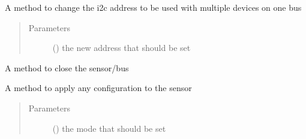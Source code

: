 \documentclass[letterpaper,10pt,english]{sphinxmanual}
\begin{document}
\begin{fulllineitems}
\begin{fulllineitems}
\label{\detokenize{sim_interfaces:lib.sim_interfaces.SimSensor.change_addr}}
A method to change the i2c address to be used with multiple devices on one bus
\begin{quote}\begin{description}
\item[{Parameters}] \leavevmode
{} () \textendash{} the new address that should be set

\end{description}\end{quote}

\end{fulllineitems}


\begin{fulllineitems}
\label{\detokenize{sim_interfaces:lib.sim_interfaces.SimSensor.close}}
A method to close the sensor/bus

\end{fulllineitems}


\begin{fulllineitems}
\label{\detokenize{sim_interfaces:lib.sim_interfaces.SimSensor.configure}}
A method to apply any configuration to the sensor
\begin{quote}\begin{description}
\item[{Parameters}] \leavevmode
{} () \textendash{} the mode that should be set

\end{description}\end{quote}

\end{fulllineitems}


\end{fulllineitems}
\end{document}
